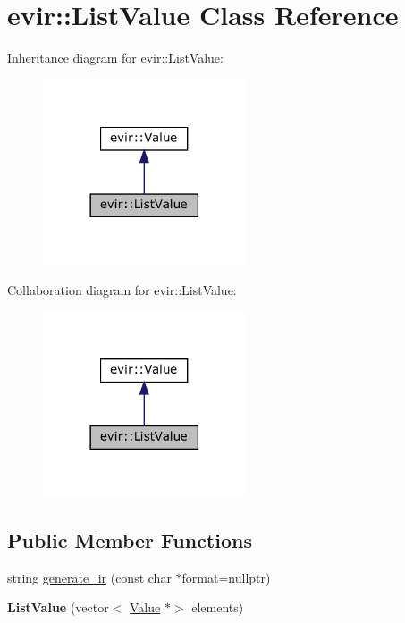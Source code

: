 \hypertarget{classevir_1_1ListValue}{}\section{evir\+:\+:List\+Value Class Reference}
\label{classevir_1_1ListValue}


Inheritance diagram for evir\+:\+:List\+Value\+:
\nopagebreak
\begin{figure}[H]
\begin{center}
\leavevmode
\includegraphics[width=170pt]{classevir_1_1ListValue__inherit__graph}
\end{center}
\end{figure}


Collaboration diagram for evir\+:\+:List\+Value\+:
\nopagebreak
\begin{figure}[H]
\begin{center}
\leavevmode
\includegraphics[width=170pt]{classevir_1_1ListValue__coll__graph}
\end{center}
\end{figure}
\subsection*{Public Member Functions}
\begin{DoxyCompactItemize}
\item 
string \hyperlink{classevir_1_1ListValue_aebd962d9117d8cd22d35bf217975dcff}{generate\+\_\+ir} (const char $\ast$format=nullptr)
\item 
\mbox{\label{classevir_1_1ListValue_a9382018da6050ec7308d0bb6e311cc30}} 
{\bfseries List\+Value} (vector$<$ \hyperlink{classevir_1_1Value}{Value} $\ast$$>$ elements)
\end{DoxyCompactItemize}
